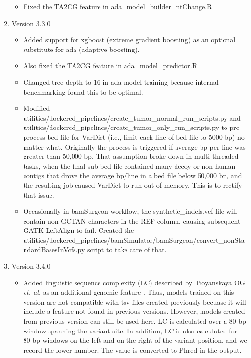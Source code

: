 \documentclass[10pt,letterpaper]{article}
\begin{document}
\begin{sloppypar}
\begin{enumerate}
		\begin{itemize}
		
			\item Fixed the TA2CG feature in ada\_model\_builder\_ntChange.R
		
		\end{itemize}


	\item Version 3.3.0
	
		\begin{itemize}

			\item Added support for xgboost (extreme gradient boosting) as an optional substitute for ada (adaptive boosting).
					
			\item Also fixed the TA2CG feature in ada\_model\_predictor.R
			
			\item Changed tree depth to 16 in ada model training because internal benchmarking found this to be optimal.
			
			\item Modified utilities/dockered\_pipelines/create\_tumor\_normal\_run\_scripts.py and utilities/dockered\_pipelines/create\_tumor\_only\_run\_scripts.py to pre-process bed file for VarDict (i.e., limit each line of bed file to 5000 bp) no matter what. Originally the process is triggered if average bp per line was greater than 50,000 bp. That assumption broke down in multi-threaded tasks, when the final sub bed file contained many decoy or non-human contigs that drove the average bp/line in a bed file below 50,000 bp, and the resulting job caused VarDict to run out of memory. This is to rectify that issue.

            \item Occasionally in bamSurgeon workflow, the synthetic\_indels.vcf file will contain non-GCTAN characters in the REF column, causing subsequent GATK LeftAlign to fail. Created the utilities/dockered\_pipelines/bamSimulator/bamSurgeon/convert\_nonStandardBasesInVcfs.py script to take care of that. 
		
		\end{itemize}

		
		
	\item Version 3.4.0
	
		\begin{itemize}
            \item Added linguistic sequence complexity (LC) described by Troyanskaya OG \textit{et. al.} as an additional genomic feature \cite{sequence_complexity}. Thus, models trained on this version are not compatible with tsv files created previously becuase it will include a feature not found in previous versions. However, models created from previous version can still be used here. LC is calculated over a 80-bp window spanning the variant site. In addition, LC is also calculated for 80-bp windows on the left and on the right of the variant position, and we record the lower number. The value is converted to Phred in the output. 


\end{itemize}
\end{enumerate}
\end{sloppypar}
\end{document}
